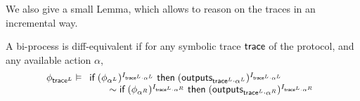 We also give a small Lemma, which allows to reason on the traces in an incremental way.

\begin{lemma}
  A bi-process is diff-equivalent if for any symbolic trace $\textsf{trace}$ of the protocol, and any available action $\alpha$,
\[\phi_{\textsf{trace}^L} \vDash
\begin{array}[t]{l}
    \textsf{if}\; (\phi_{\alpha^L})^{I_{\textsf{trace}^L \cdot \alpha^L}} \;\textsf{then}\; (\textsf{outputs}_{\textsf{trace}^L\cdot \alpha^L})^{I_{\textsf{trace}^L\cdot \alpha^L}}
    \\ \qquad
    \sim  \textsf{if}\; (\phi_{\alpha^R})^{I_{\textsf{trace}^L \cdot \alpha^R}} \;\textsf{then}\; (\textsf{outputs}_{\textsf{trace}^L\cdot \alpha^R})^{I_{\textsf{trace}^L\cdot \alpha^R}} \end{array}\]

\end{lemma}

